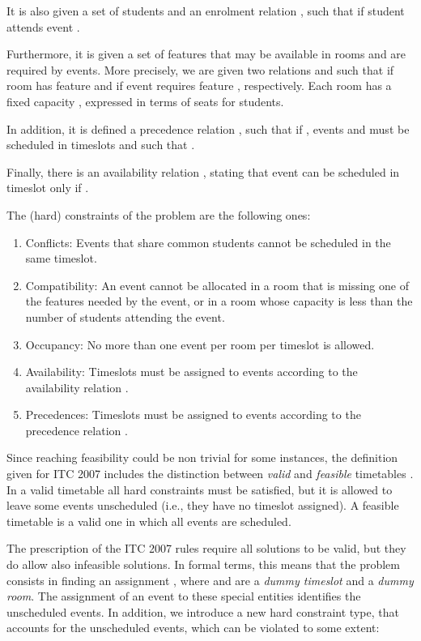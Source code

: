 \documentclass[authoryear,preprint,a4paper,12pt]{elsarticle}
\begin{document}
It is also given a set of students  and an enrolment
relation , such
that  if student  attends event .

Furthermore, it is given a set of features  that may be
available in rooms and are required by events. More precisely, we are
given two relations 
and  such that
 if room  has feature  and  if
event  requires feature , respectively. Each room  has a fixed capacity , expressed in terms of seats
for students.

In addition, it is defined a precedence relation , such that if , 
events  and  must be scheduled in timeslots  and 
such that .

Finally, there is an availability relation , stating that event  can be scheduled in timeslot  only if
.

The (hard) constraints of the problem are the following
ones:

\begin{enumerate}[H1.]
\item \textsf{Conflicts:} Events that share common students cannot be
  scheduled in the same timeslot.
\item \textsf{Compatibility:} An event cannot be allocated in a room
  that is missing one of the features needed by the event, or in a room
  whose capacity is less than the number of students attending the
  event.
\item \textsf{Occupancy:} No more than one event per room per timeslot
  is allowed.
\item \textsf{Availability:} Timeslots must be assigned to events
  according to the availability relation .
\item \textsf{Precedences:} Timeslots must be assigned to events
  according to the precedence relation .
\end{enumerate}

Since reaching feasibility could be non trivial for some instances, the definition given for ITC
2007 includes the distinction between \emph{valid} and 
\emph{feasible} timetables \cite[see][]{LePM07}.  In a valid timetable all
hard constraints must be satisfied, but it is allowed to leave some events unscheduled (i.e., they have no timeslot assigned). A feasible
timetable is a valid one in which all events are scheduled.

The prescription of the ITC 2007 rules require all solutions to be
valid, but they do allow also infeasible solutions.  In formal terms,
this means that the problem consists in finding an assignment
, where  and  are a
\emph{dummy timeslot} and a \emph{dummy room}. The assignment of an
event to these special entities identifies the unscheduled events. In
addition, we introduce a new hard constraint type, that accounts for
the unscheduled events, which can be violated to some extent:
\end{document}
